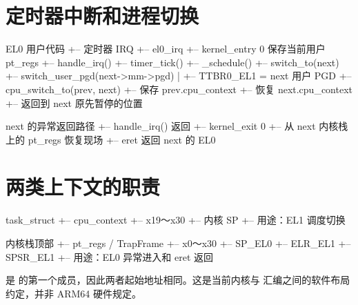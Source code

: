 
\section{定时器中断和进程切换}

\begin{txtcode}
EL0 用户代码
+-- 定时器 IRQ
    +-- el0_irq
        +-- kernel_entry 0                       保存当前用户 pt_regs
        +-- handle_irq()
            +-- timer_tick()
                +-- _schedule()
                    +-- switch_to(next)
                        +-- switch_user_pgd(next->mm->pgd)
                        |   +-- TTBR0_EL1 = next 用户 PGD
                        +-- cpu_switch_to(prev, next)
                            +-- 保存 prev.cpu_context
                            +-- 恢复 next.cpu_context
                            +-- 返回到 next 原先暂停的位置

next 的异常返回路径
+-- handle_irq() 返回
    +-- kernel_exit 0
        +-- 从 next 内核栈上的 pt_regs 恢复现场
        +-- eret 返回 next 的 EL0
\end{txtcode}

\section{两类上下文的职责}

\begin{txtcode}
task_struct
+-- cpu_context
    +-- x19～x30
    +-- 内核 SP
    +-- 用途：EL1 调度切换

内核栈顶部
+-- pt_regs / TrapFrame
    +-- x0～x30
    +-- SP_EL0
    +-- ELR_EL1
    +-- SPSR_EL1
    +-- 用途：EL0 异常进入和 eret 返回
\end{txtcode}

 是  的第一个成员，因此两者起始地址相同。这是当前内核与  汇编之间的软件布局约定，并非 ARM64 硬件规定。

